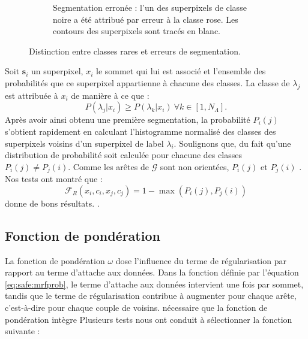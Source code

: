\begin{figure}[htb]
\begin{subfigure}[t]{0.45\textwidth}
		 \caption{Segmentation erronée : l'un des superpixels de  classe noire a été attribué par erreur à la classe rose. Les contours des superpixels sont tracés en blanc.}
	\end{subfigure}	
	\caption{Distinction entre classes rares et erreurs de segmentation.}
	\label{fig:saf:classesRares}
\end{figure}

Soit $\mathbf{s}_{i}$ un superpixel, $x_{i}$ le sommet qui lui est associé et  l'ensemble des probabilités que ce superpixel appartienne à chacune des classes. La classe de  $\lambda_{j}$ est attribuée à $x_{i}$ de manière à ce que :
\begin{equation}
P(\lambda_{j}|x_{i} )  \geqslant  P(\lambda_{k} | x_{i})\  \forall  k \in [1,N_{\Lambda}] \text{.}
\end{equation}
Après avoir ainsi obtenu une première segmentation, la probabilité $P_{i}(j)$ s'obtient rapidement en calculant l'histogramme normalisé des classes des superpixels voisins d'un superpixel de label $\lambda_{i}$. Soulignons que, du fait qu'une distribution de probabilité soit calculée pour chacune des classes $P_{i}(j) \neq P_{j}(i)$. Comme les arêtes de $\mathcal{G}$ sont non orientées, $P_{i}(j)$ et $P_{j}(i)$ . Nos tests ont montré que :
\begin{equation}
\mathcal{F}_{R}(x_{i},c_{i},x_{j},c_{j})= 1-\max(P_{i}(j),P_{j}(i))
\end{equation}
donne de bons résultats. .

\subsection{Fonction de pondération}
La fonction de pondération $\omega$ dose l'influence du terme de régularisation par rapport au terme d'attache aux données. Dans la fonction  définie par l'équation \ref{eq:safe:mrfprob}, le terme d'attache aux données intervient une fois par sommet, tandis que le terme de régularisation contribue à augmenter  pour chaque arête, c'est-à-dire pour chaque couple de  voisins.  nécessaire que la fonction de pondération intègre  Plusieurs tests nous ont conduit à sélectionner la fonction suivante :

